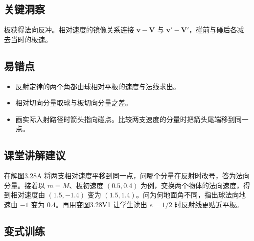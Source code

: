 \documentclass[UTF8,fontset=fandol,a4paper,11pt]{ctexart}
\newcommand{\vect}[1]{\bm{#1}}
\begin{document}


\subsection*{关键洞察}

板获得法向反冲。相对速度的镜像关系连接 $\vect v-\vect V$ 与 $\vect v'-\vect V'$，碰前与碰后各减去当时的板速。



\subsection*{易错点}

\begin{itemize}
\item 反射定律的两个角都由球相对平板的速度与法线求出。
\item 相对切向分量取球与板切向分量之差。
\item 画实际入射路径时箭头指向碰点。比较两支速度的分量时把箭头尾端移到同一点。
\end{itemize}



\subsection*{课堂讲解建议}

在解图3.28A 将两支相对速度平移到同一点，问哪个分量在反射时改号，答为法向分量。接着以 $m=M$、板初速度 $(0.5,0.4)$ 为例，交换两个物体的法向速度，得到相对速度由 $(1.5,-1.4)$ 变为 $(1.5,1.4)$。问为何地面角不同，指出球法向地速由 $-1$ 变为 $0.4$。再用变图3.28V1 让学生读出 $e=1/2$ 时反射线更贴近平板。



\subsection*{变式训练}
\end{document}
